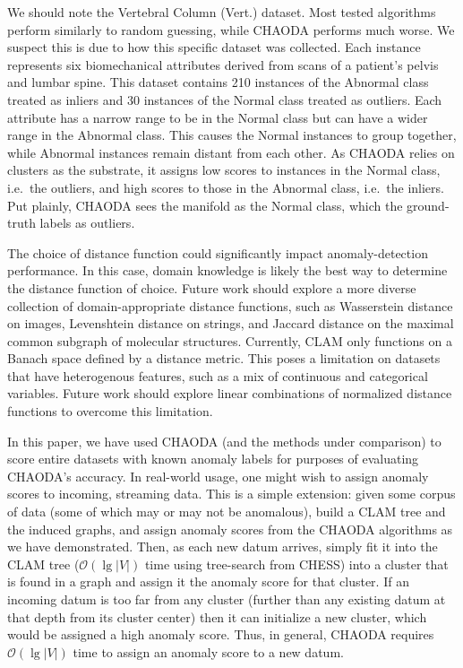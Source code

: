 We should note the Vertebral Column (Vert.) dataset.
Most tested algorithms perform similarly to random guessing, while CHAODA performs much worse.
We suspect this is due to how this specific dataset was collected.
Each instance represents six biomechanical attributes derived from scans of a patient's pelvis and lumbar spine.
This dataset contains 210 instances of the Abnormal class treated as inliers and 30 instances of the Normal class treated as outliers.
Each attribute has a narrow range to be in the Normal class but can have a wider range in the Abnormal class.
This causes the Normal instances to group together, while Abnormal instances remain distant from each other.
As CHAODA relies on clusters as the substrate, it assigns low scores to instances in the Normal class, i.e.\ the outliers, and high scores to those in the Abnormal class, i.e.\ the inliers.
Put plainly, CHAODA sees the manifold as the Normal class, which the ground-truth labels as outliers.

The choice of distance function could significantly impact anomaly-detection performance.
In this case, domain knowledge is likely the best way to determine the distance function of choice.
Future work should explore a more diverse collection of domain-appropriate distance functions, such as Wasserstein distance on images, Levenshtein distance on strings, and Jaccard distance on the maximal common subgraph of molecular structures.
Currently, CLAM only functions on a Banach space defined by a distance metric.
This poses a limitation on datasets that have heterogenous features, such as a mix of continuous and categorical variables.
Future work should explore linear combinations of normalized distance functions to overcome this limitation.

In this paper, we have used CHAODA (and the methods under comparison) to score entire datasets with known anomaly labels for purposes of evaluating CHAODA's accuracy.
In real-world usage, one might wish to assign anomaly scores to incoming, streaming data.
This is a simple extension: given some corpus of data (some of which may or may not be anomalous), build a CLAM tree and the induced graphs, and assign anomaly scores from the CHAODA algorithms as we have demonstrated.
Then, as each new datum arrives, simply fit it into the CLAM tree ($\mathcal{O}(\lg |V|)$ time using tree-search from CHESS) into a cluster that is found in a graph and assign it the anomaly score for that cluster.
If an incoming datum is too far from any cluster (further than any existing datum at that depth from its cluster center) then it can initialize a new cluster, which would be assigned a high anomaly score.
Thus, in general, CHAODA requires $\mathcal{O}(\lg |V|)$ time to assign an anomaly score to a new datum.

